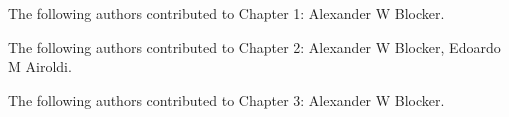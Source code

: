\indent
The following authors contributed to Chapter 1: Alexander W Blocker.

The following authors contributed to Chapter 2: Alexander W Blocker, Edoardo M Airoldi.

The following authors contributed to Chapter 3: Alexander W Blocker. 
